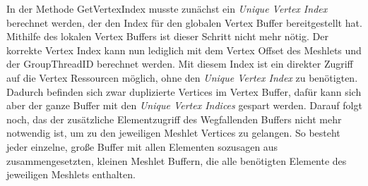 In der Methode GetVertexIndex musste zunächst ein \textit{Unique Vertex Index} berechnet werden, der den Index für den globalen Vertex Buffer bereitgestellt hat.
Mithilfe des lokalen Vertex Buffers ist dieser Schritt nicht mehr nötig.
Der korrekte Vertex Index kann nun lediglich mit dem Vertex Offset des Meshlets und der GroupThreadID berechnet werden.
Mit diesem Index ist ein direkter Zugriff auf die Vertex Ressourcen möglich, ohne den \textit{Unique Vertex Index} zu benötigten.
Dadurch befinden sich zwar duplizierte Vertices im Vertex Buffer, dafür kann sich aber der ganze Buffer mit den \textit{Unique Vertex Indices} gespart werden.
Darauf folgt noch, das der zusätzliche Elementzugriff des Wegfallenden Buffers nicht mehr notwendig ist, um zu den jeweiligen Meshlet Vertices zu gelangen.
So besteht jeder einzelne, große Buffer mit allen Elementen sozusagen aus zusammengesetzten, kleinen Meshlet Buffern, die alle benötigten Elemente des jeweiligen Meshlets enthalten.